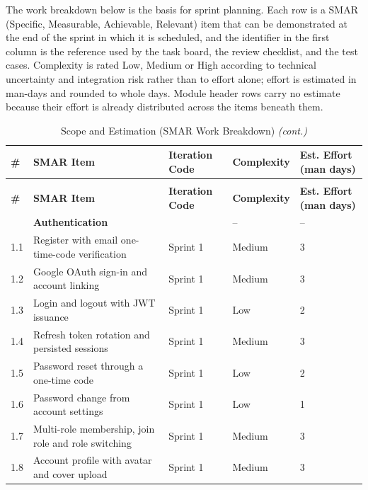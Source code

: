 The work breakdown below is the basis for sprint planning. Each row is a SMAR (Specific, Measurable, Achievable, Relevant) item that can be demonstrated at the end of the sprint in which it is scheduled, and the identifier in the first column is the reference used by the task board, the review checklist, and the test cases. Complexity is rated Low, Medium or High according to technical uncertainty and integration risk rather than to effort alone; effort is estimated in man-days and rounded to whole days. Module header rows carry no estimate because their effort is already distributed across the items beneath them.

\begingroup
\setlength{\tabcolsep}{4pt}

\begin{longtable}{|
C{1.0cm}|
L{6.9cm}|
C{1.8cm}|
C{2.1cm}|
C{2.3cm}|}

\caption{Scope and Estimation (SMAR Work Breakdown)}
\label{tab:scope-estimation} \\
\hline
{} \textbf{\#} & \textbf{SMAR Item} & \textbf{Iteration Code} & \textbf{Complexity} & \textbf{Est. Effort (man days)} \\
\hline
\endfirsthead

\caption[]{Scope and Estimation (SMAR Work Breakdown) \textit{(cont.)}} \\
\hline
{} \textbf{\#} & \textbf{SMAR Item} & \textbf{Iteration Code} & \textbf{Complexity} & \textbf{Est. Effort (man days)} \\
\hline
\endhead

\hline
\endfoot

\hline\hline
\endlastfoot

 & \textbf{Authentication} &  & -- & -- \\
1.1 & Register with email one-time-code verification & Sprint 1 & Medium & 3 \\
1.2 & Google OAuth sign-in and account linking & Sprint 1 & Medium & 3 \\
1.3 & Login and logout with JWT issuance & Sprint 1 & Low & 2 \\
1.4 & Refresh token rotation and persisted sessions & Sprint 1 & Medium & 3 \\
1.5 & Password reset through a one-time code & Sprint 1 & Low & 2 \\
1.6 & Password change from account settings & Sprint 1 & Low & 1 \\
1.7 & Multi-role membership, join role and role switching & Sprint 1 & Medium & 3 \\
1.8 & Account profile with avatar and cover upload & Sprint 1 & Medium & 3 \\
\hline


\end{longtable}
